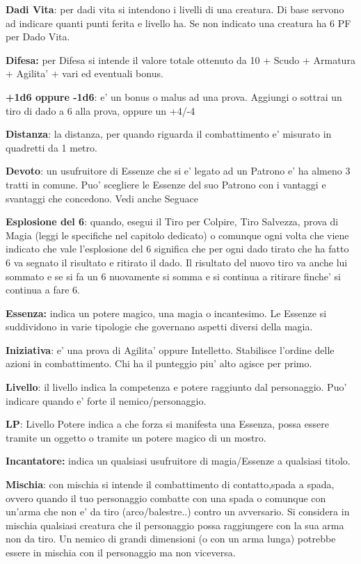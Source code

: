 \documentclass[a4paper,11pt,twoside,openany]{dndbook}
\begin{document}
\textbf{Dadi Vita}: per dadi vita si intendono i livelli di una creatura. Di base servono ad indicare quanti punti ferita e livello ha. Se non indicato una creatura ha 6 PF per Dado Vita.

\textbf{Difesa:} per Difesa si intende il valore totale ottenuto da 10 + Scudo + Armatura + Agilita' + vari ed eventuali bonus.

\textbf{+1d6 oppure -1d6}: e' un bonus o malus ad una prova. Aggiungi o sottrai un tiro di dado a 6 alla prova, oppure un +4/-4

\textbf{Distanza}: la distanza, per quando riguarda il combattimento e' misurato in quadretti da 1 metro.

\textbf{Devoto}: un usufruitore di Essenze che si e’ legato ad un Patrono e’ ha almeno 3 tratti in comune.
Puo’ scegliere le Essenze del suo Patrono con i vantaggi e svantaggi che concedono. Vedi anche Seguace

\textbf{Esplosione del 6}: quando, esegui il Tiro per Colpire, Tiro Salvezza, prova di Magia (leggi le specifiche nel capitolo dedicato) o comunque ogni volta che viene indicato che vale l'esplosione del 6 significa che per ogni dado tirato che ha fatto 6 va segnato il risultato e ritirato il dado. Il risultato del nuovo tiro va anche lui sommato e se si fa un 6 nuovamente si somma e si continua a ritirare finche' si continua a fare 6.

\textbf{Essenza:} indica un potere magico, una magia o incantesimo. Le Essenze si suddividono in varie tipologie che governano aspetti diversi della magia.

\textbf{Iniziativa}: e' una prova di Agilita' oppure Intelletto. Stabilisce l'ordine delle azioni in combattimento. Chi ha il punteggio piu' alto agisce per primo.

\textbf{Livello}: il livello indica la competenza e potere raggiunto dal personaggio. Puo' indicare quando e' forte il nemico/personaggio. 

\textbf{LP}: Livello Potere indica a che forza si manifesta una Essenza, possa essere tramite un oggetto o tramite un potere magico di un mostro.

\textbf{Incantatore:} indica un qualsiasi usufruitore di magia/Essenze a qualsiasi titolo.

\textbf{Mischia}: con mischia si intende il combattimento di contatto,spada a spada, ovvero quando il tuo personaggio combatte con una spada o comunque con un'arma che non e' da tiro (arco/balestre..) contro un avversario.
Si considera in mischia qualsiasi creatura che il personaggio possa raggiungere con la sua arma non da tiro. Un nemico di grandi dimensioni (o con un arma lunga) potrebbe essere in mischia con il personaggio ma non viceversa.
\end{document}
